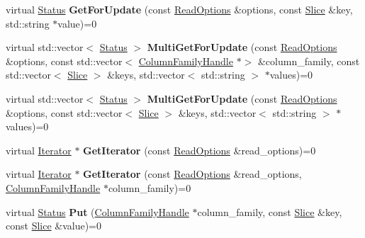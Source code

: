 \begin{DoxyCompactItemize}
\item 
virtual \hyperlink{classrocksdb_1_1Status}{Status} {\bfseries Get\+For\+Update} (const \hyperlink{structrocksdb_1_1ReadOptions}{Read\+Options} \&options, const \hyperlink{classrocksdb_1_1Slice}{Slice} \&key, std\+::string $\ast$value)=0\hypertarget{classrocksdb_1_1Transaction_a744e9197d5833b1700464874de31fe21}{}\label{classrocksdb_1_1Transaction_a744e9197d5833b1700464874de31fe21}

\item 
virtual std\+::vector$<$ \hyperlink{classrocksdb_1_1Status}{Status} $>$ {\bfseries Multi\+Get\+For\+Update} (const \hyperlink{structrocksdb_1_1ReadOptions}{Read\+Options} \&options, const std\+::vector$<$ \hyperlink{classrocksdb_1_1ColumnFamilyHandle}{Column\+Family\+Handle} $\ast$$>$ \&column\+\_\+family, const std\+::vector$<$ \hyperlink{classrocksdb_1_1Slice}{Slice} $>$ \&keys, std\+::vector$<$ std\+::string $>$ $\ast$values)=0\hypertarget{classrocksdb_1_1Transaction_a552fff326c25e5cb90469d62479f02c0}{}\label{classrocksdb_1_1Transaction_a552fff326c25e5cb90469d62479f02c0}

\item 
virtual std\+::vector$<$ \hyperlink{classrocksdb_1_1Status}{Status} $>$ {\bfseries Multi\+Get\+For\+Update} (const \hyperlink{structrocksdb_1_1ReadOptions}{Read\+Options} \&options, const std\+::vector$<$ \hyperlink{classrocksdb_1_1Slice}{Slice} $>$ \&keys, std\+::vector$<$ std\+::string $>$ $\ast$values)=0\hypertarget{classrocksdb_1_1Transaction_ab77be938cbff6e85462abc0385e2d62a}{}\label{classrocksdb_1_1Transaction_ab77be938cbff6e85462abc0385e2d62a}

\item 
virtual \hyperlink{classrocksdb_1_1Iterator}{Iterator} $\ast$ {\bfseries Get\+Iterator} (const \hyperlink{structrocksdb_1_1ReadOptions}{Read\+Options} \&read\+\_\+options)=0\hypertarget{classrocksdb_1_1Transaction_acef7c20c65310fd1dbf995705f4f4e0d}{}\label{classrocksdb_1_1Transaction_acef7c20c65310fd1dbf995705f4f4e0d}

\item 
virtual \hyperlink{classrocksdb_1_1Iterator}{Iterator} $\ast$ {\bfseries Get\+Iterator} (const \hyperlink{structrocksdb_1_1ReadOptions}{Read\+Options} \&read\+\_\+options, \hyperlink{classrocksdb_1_1ColumnFamilyHandle}{Column\+Family\+Handle} $\ast$column\+\_\+family)=0\hypertarget{classrocksdb_1_1Transaction_afde1ced51be675977962ccd7445fa5de}{}\label{classrocksdb_1_1Transaction_afde1ced51be675977962ccd7445fa5de}

\item 
virtual \hyperlink{classrocksdb_1_1Status}{Status} {\bfseries Put} (\hyperlink{classrocksdb_1_1ColumnFamilyHandle}{Column\+Family\+Handle} $\ast$column\+\_\+family, const \hyperlink{classrocksdb_1_1Slice}{Slice} \&key, const \hyperlink{classrocksdb_1_1Slice}{Slice} \&value)=0\hypertarget{classrocksdb_1_1Transaction_a60cc89e6a09632f30ce678b806a56a74}{}\label{classrocksdb_1_1Transaction_a60cc89e6a09632f30ce678b806a56a74}


\end{DoxyCompactItemize}

